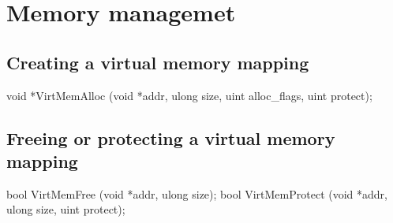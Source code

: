 \section{Memory managemet}
\label{sec:abi:memory}

\subsection*{Creating a virtual memory mapping}

\begin{paldef}
void *VirtMemAlloc (void *addr, ulong size,
                    uint alloc_flags, uint protect);
\end{paldef}


\subsection*{Freeing or protecting a virtual memory mapping}

\begin{paldef}
bool VirtMemFree (void *addr, ulong size);
bool VirtMemProtect (void *addr, ulong size, uint protect);
\end{paldef}





